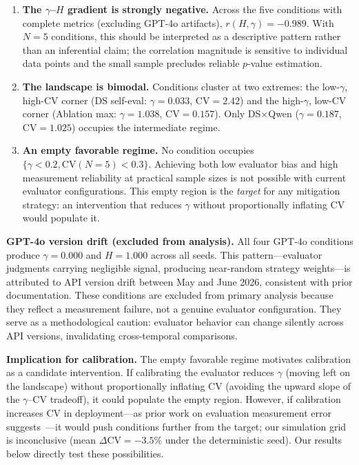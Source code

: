 \documentclass[11pt]{article}
\newcommand{\CV}{\ensuremath{\mathrm{CV}}}
\theoremstyle{definition}
\theoremstyle{remark}
\begin{document}
\begin{enumerate}[leftmargin=*,nosep]
 \item \textbf{The $\gamma$--$H$ gradient is strongly negative.} Across the five conditions with complete metrics (excluding GPT-4o artifacts), $r(H, \gamma) = -0.989$. With $N{=}5$ conditions, this should be interpreted as a descriptive pattern rather than an inferential claim; the correlation magnitude is sensitive to individual data points and the small sample precludes reliable $p$-value estimation.
 \item \textbf{The landscape is bimodal.} Conditions cluster at two extremes: the low-$\gamma$, high-CV corner (DS self-eval: $\gamma{=}0.033$, CV${=}2.42$) and the high-$\gamma$, low-CV corner (Ablation max: $\gamma{=}1.038$, CV${=}0.157$). Only DS$\times$Qwen ($\gamma{=}0.187$, CV${=}1.025$) occupies the intermediate regime.
 \item \textbf{An empty favorable regime.} No condition occupies $\{\gamma < 0.2, \CV(N{=}5) < 0.3\}$. Achieving both low evaluator bias and high measurement reliability at practical sample sizes is not possible with current evaluator configurations. This empty region is the \textit{target} for any mitigation strategy: an intervention that reduces $\gamma$ without proportionally inflating CV would populate it.
\end{enumerate}

\textbf{GPT-4o version drift (excluded from analysis).} All four GPT-4o conditions produce $\gamma{=}0.000$ and $H{=}1.000$ across all seeds. This pattern---evaluator judgments carrying negligible signal, producing near-random strategy weights---is attributed to API version drift between May and June 2026, consistent with prior documentation. These conditions are excluded from primary analysis because they reflect a measurement failure, not a genuine evaluator configuration. They serve as a methodological caution: evaluator behavior can change silently across API versions, invalidating cross-temporal comparisons.

\textbf{Implication for calibration.} The empty favorable regime motivates calibration as a candidate intervention. If calibrating the evaluator reduces $\gamma$ (moving left on the landscape) without proportionally inflating CV (avoiding the upward slope of the $\gamma$--CV tradeoff), it could populate the empty region. However, if calibration increases CV in deployment---as prior work on evaluation measurement error suggests~\citep{messing2026tee}---it would push conditions further from the target; our simulation grid is inconclusive (mean $\Delta\CV = -3.5\%$ under the deterministic seed). Our results below directly test these possibilities.
\end{document}
